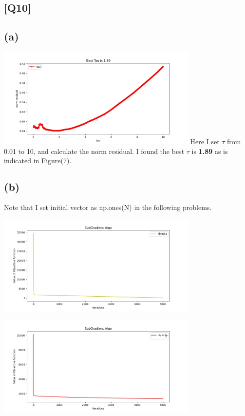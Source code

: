 \documentclass[12pt, a4 paper]{article}
\begin{document}
    \begin{framed}
        \section{[Q10]}
        \subsection{(a)}
        {\centering
        \includegraphics[width=10cm, height=5cm]{Q10_1.jpg}
        }
        \indent Here I set $\tau$ from 0.01 to 10, and calculate the norm residual.
        I found the best $\tau$ is \textbf{1.89} as is indicated in Figure(7).

        \subsection{(b)}
        Note that I set initial vector as np.ones(N) in the following 
        problems.

        {\centering
        \includegraphics[width=10cm, height=5cm]{Q10_2_3.jpg}
        }

        {\centering
        \includegraphics[width=10cm, height=5cm]{Q10_2_1.jpg}
        }
        

\end{framed}
\end{document}
